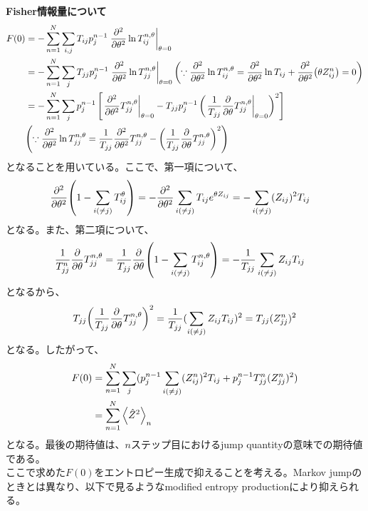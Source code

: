 \documentclass[a4paper,11pt]{jsarticle}
\numberwithin{equation}{section}
\begin{document}
\textbf{Fisher情報量について}\\
\begin{align}
    F(0) &= -\sum_{n=1}^{N} \sum_{i,j} T_{ij} p_j^{n-1} \eval{\frac{\partial^2}{\partial \theta^2} \ln T_{ij}^{n,\theta}}_{\theta=0} \\
    &= -\sum_{n=1}^{N} \sum_{j} T_{jj} p_j^{n-1} \eval{\frac{\partial^2}{\partial \theta^2} \ln T_{jj}^{n,\theta}}_{\theta=0} \qty(\because \pdv[2]{\theta}\ln{T_{ij}^{n,\theta}} = \pdv[2]{\theta} \ln T_{ij} + \pdv[2]{\theta} (\theta Z_{ij}^n) = 0)\\
    &= -\sum_{n=1}^{N} \sum_{j} p_j^{n-1} \left[
        \eval{\frac{\partial^2}{\partial \theta^2} T_{jj}^{n,\theta}}_{\theta=0}
        - T_{jj} p_j^{n-1} \left( \eval{\frac{1}{T_{jj}} \frac{\partial}{\partial \theta} T_{jj}^{n,\theta}}_{\theta=0} \right)^2
    \right]\\
    &\qty(\because \pdv[2]{\theta} \ln T_{jj}^{n,\theta} = \frac{1}{T_{jj}} \pdv[2]{\theta} T_{jj}^{n,\theta} - \qty(\frac{1}{T_{jj}} \pdv{\theta} T_{jj}^{n,\theta})^2)\\
\end{align}
となることを用いている。ここで、第一項について、
\begin{align}
    \pdv[2]{\theta}(1-\sum_{i(\neq j)}T_{ij}^\theta) &= -\pdv[2]{\theta}\sum_{i(\neq j)}T_{ij}e^{\theta Z_{ij}} = -\sum_{i(\neq j)}(Z_{ij})^2 T_{ij} 
\end{align}
となる。また、第二項について、
\begin{align}
    \frac{1}{T_{jj}^n} \pdv{\theta} T_{jj}^{n,\theta} &= \frac{1}{T_{jj}} \pdv{\theta} (1-\sum_{i(\neq j)}T_{ij}^{n,\theta}) = -\frac{1}{T_{jj}} \sum_{i(\neq j)} Z_{ij} T_{ij}
\end{align}
となるから、
\begin{align}
    T_{jj}\qty(\frac{1}{T_{jj}} \pdv{\theta} T_{jj}^{n,\theta})^2 = \frac{1}{T_{jj}} (\sum_{i(\neq j)} Z_{ij} T_{ij})^2 =T_{jj}(Z_{jj}^n)^2
\end{align}
となる。したがって、    
\begin{align}
    F(0) &= \sum_{n=1}^{N} \sum_{j} (p_j^{n-1} \sum_{i(\neq j)}(Z_{ij}^n)^2 T_{ij} + p_j^{n-1} T_{jj}^n (Z_{jj}^n)^2)\\
    &= \sum_{n=1}^{N} \ev{\hat{Z}^2}_n
\end{align}
となる。最後の期待値は、$n$ステップ目におけるjump quantityの意味での期待値である。\\
ここで求めた$F(0)$をエントロピー生成で抑えることを考える。Markov jumpのときとは異なり、以下で見るようなmodified entropy productionにより抑えられる。\\
\end{document}
